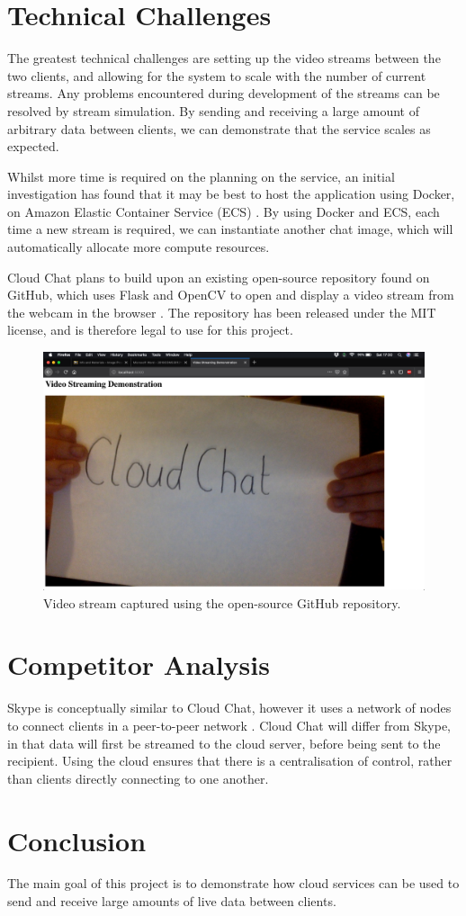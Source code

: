 \documentclass[conference]{IEEEtran}
\begin{document}
\section{Technical Challenges}
The greatest technical challenges are setting up the video streams between the two clients, and allowing for the system to scale with the number of current streams. Any problems encountered during development of the streams can be resolved by stream simulation. By sending and receiving a large amount of arbitrary data between clients, we can demonstrate that the service scales as expected.
\par
Whilst more time is required on the planning on the service, an initial investigation has found that it may be best to host the application using Docker, on Amazon Elastic Container Service (ECS) \cite{antonopoulos2010cloud}. By using Docker and ECS, each time a new stream is required, we can instantiate another chat image, which will automatically allocate more compute resources.
\par
Cloud Chat plans to build upon an existing open-source repository found on GitHub, which uses Flask and OpenCV to open and display a video stream from the webcam in the browser \cite{miguelgrinberg}. The repository has been released under the MIT license, and is therefore legal to use for this project. 
\begin{figure}[htbp]
\begin{center}
\includegraphics[width=0.6\linewidth]{screen.png}
\caption{Video stream captured using the open-source GitHub repository\cite{miguelgrinberg}.}
\label{default}
\end{center}
\end{figure}
\vspace{-0.5cm}
\section{Competitor Analysis}
Skype is conceptually similar to Cloud Chat, however it uses a network of nodes to connect clients in a peer-to-peer network \cite{baset2004analysis}. Cloud Chat will differ from Skype, in that data will first be streamed to the cloud server, before being sent to the recipient. Using the cloud ensures that there is a centralisation of control, rather than clients directly connecting to one another. 
\section{Conclusion}
The main goal of this project is to demonstrate how cloud services can be used to send and receive large amounts of live data between clients.



\end{document}
